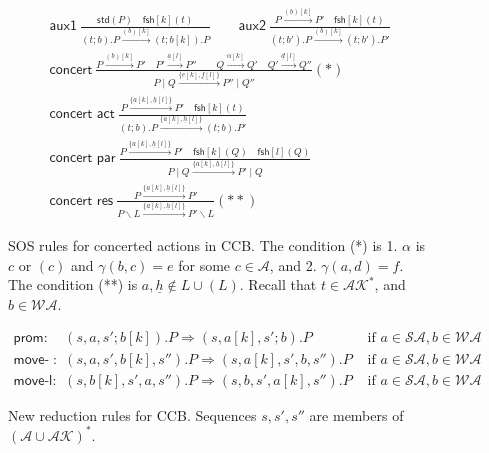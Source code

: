 \documentclass[runningheads]{llncs}
\newcommand{\Rule}[2]{\displaystyle{\frac{#1}{#2}}}
\newcommand{\paral}{\; \vert \;}
\newcommand{\mAK}{\mathcal{AK}}
\newcommand{\std}[1]{\mathsf{std}(#1)}
\newcommand{\fresh}[2]{\mathsf{fsh}[#1](#2)}
\newcommand{\rulename}[1]{\textsf{#1}}
\begin{document}
\begin{figure}
\vspace{-2ex}\[
\begin{array}{l}
\rulename{aux1}\ 
\Rule{\std{P} \quad \fresh{k}{t}}
{(t;b).P \xrightarrow{(b)[k]}(t;b[k]).P}
\qquad
\rulename{aux2}\
\Rule
{P \xrightarrow{(b)[k]} P' \quad \fresh{k}{t}}
{(t;b').P \xrightarrow{(b)[k]} (t;b').P'}
\\[15pt]
\rulename{concert}\ 
\Rule
{P\xrightarrow{(b)[k]}P' \quad P'\xrightarrow{\underline{a}[l]}P'' \qquad Q\xrightarrow{\alpha[k]}Q' 
  \quad Q'\xrightarrow{\underline{d}[l]}Q''%
 }
{P \paral Q\xrightarrow{\{e[k],\underline{f}[l]\}} P'' \paral Q''} (*)\\[15pt]
\rulename{concert act}\
\Rule
{P \xrightarrow{\{{a}[k], \underline{h}[l]\}} P' \quad \fresh{k}{t}}
{(t;b).P \xrightarrow{\{{a}[k], \underline{h}[l]\}} (t;b).P'}\\[15pt]
\rulename{concert par}\
\Rule
{P \xrightarrow{\{{a}[k], \underline{h}[l]\}} P'\quad \fresh{k}{Q} \quad \fresh{l}{Q}}
{P \paral Q \xrightarrow{\{{a}[k], \underline{h}[l]\}} P' \paral Q}\\[15pt]
\rulename{concert res}\
\Rule
{P \xrightarrow{\{{a}[k], \underline{h}[l]\}} P'}
{P\backslash L \xrightarrow{\{{a}[k], \underline{h}[l]\}} P'\backslash L} (**)
%
\end{array}
\] 
\vspace{-2ex}\caption[SOS rules for concerted actions in CCB.]{SOS rules for concerted actions in CCB. The condition (*) is 1. $\alpha$ is $c$ or $(c)$ 
and $\gamma(b,c)=e$ for some $c\in \mathcal{A}$, and 2. $\gamma(a,d)=f$. 
The condition (**) is $a, \underline{h}  \notin L \cup (L)$. 
Recall that $t \in \mAK^*$, and $b \in \mathcal{WA}$.} \label{fig:csos}
\vspace{-2ex}\end{figure}

\begin{figure}
\vspace{-6ex}\[
\begin{array}{lll}
\rulename{prom}: & (s,a,s';b[k]).P \Rightarrow (s,a[k],s';b).P & \mbox{ if } a \in \mathcal{SA}, b \in \mathcal{WA} 
\\[5pt]
\rulename{move-r}: & (s,a,s',b[k],s'').P \Rightarrow (s,a[k],s',b,s'').P & \mbox{ if } a \in \mathcal{SA}, b \in \mathcal{WA}
\\[5pt]
\rulename{move-l}: & (s,b[k],s',a,s'').P \Rightarrow (s,b,s',a[k],s'').P & \mbox{ if } a \in \mathcal{SA}, b \in \mathcal{WA}
\end{array}
\] 
\vspace{-2ex}\caption[Reduction rules for CCB.]{New reduction rules for CCB. Sequences $s, s', s''$ are members of $(\mathcal{A} \cup \mathcal{AK})^{*}$.} 
\label{fig:reduction}
\vspace{-2ex}\end{figure}
\end{document}
